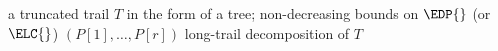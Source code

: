 \begin{algorithm}
    \begin{algorithmic}[1]
    \Require a truncated trail $T$ in the form of a tree; non-decreasing bounds on $\EDP{}$ (or $\ELC{}$) $(P[1], \ldots, P[r])$
    \Ensure long-trail decomposition of $T$
    \end{algorithmic}
\end{algorithm}

